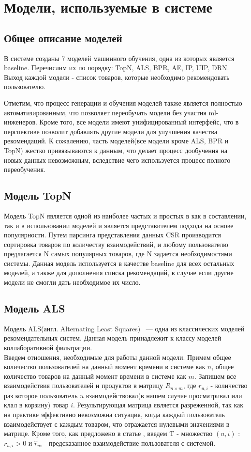 \documentclass[14pt]{mmcs_article}
\begin{document}
\section{Модели, используемые в системе}

\subsection{Общее описание моделей}
В системе созданы 7 моделей машинного обучения, одна из которых является baseline. Перечислим их по порядку: TopN, ALS, BPR, AE, IP, UIP, DRN. Выход каждой модели - список товаров, которые необходимо рекомендовать пользователю. 

Отметим, что процесс генерации и обучения моделей также является полностью автоматизированным, что позволяет переобучать модели без участия ml-инженеров. Кроме того, все модели имеют унифицированный интерфейс, что в перспективе позволит добавлять другие модели для улучшения качества рекомендаций. К сожалению, часть моделей(все модели кроме ALS, BPR и TopN) жестко привязываются к данным, что делает процесс дообучения на новых данных невозможным, вследствие чего используется процесс полного переобучения. 


\subsection{Модель TopN}
Модель TopN является одной из наиболее частых и простых в как в составлении, так и в использовании моделей и является представителем подхода на основе популярности. \cite{ALS:recsys} Путем парсинга представления данных CSR производится сортировка товаров по количеству взаимодействий, и любому пользователю предлагается N самых популярных товаров, где N задается необходимостями системы. Данная модель используется в качестве baseline для всех остальных моделей, а также для дополнения списка рекомендаций, в случае если другие модели не смогли дать необходимое их число.
\subsection{Модель ALS}
Модель ALS(англ. Alternating Least Squares) \cite{ALS:CFIFD} ~--- одна из классических моделей рекомендательных систем. Данная модель принадлежит к классу моделей коллаборативной фильтрации. \\
Введем отношения, необходимые для работы данной модели.
Примем общее количество пользователей на данный момент времени в системе как $n$, общее количество товаров на данный момент времени в системе как $m$. Запишем все взаимодействия пользователей и продуктов в матрицу $R_{n \times m}$, где $r_{u,i}$ - количество раз которое пользователь $u$ взаимодействовал(в нашем случае просматривал или клал в корзину) товар $i$.  Результирующая матрица является разреженной, так как на практике эффективно невозможна ситуация, когда каждый пользователь взаимодействует с каждым товаром, что отражается нулевыми значениями в матрице. Кроме того, как предложено в статье \cite {ALS:rwe}, введем $\mathrm{T}$ - множество $(u, i)$ : $r_{u,i} > 0$ и $\hat{r}_{ui}$ - предсказанное взаимодействие пользователя с системой.
\end{document}
